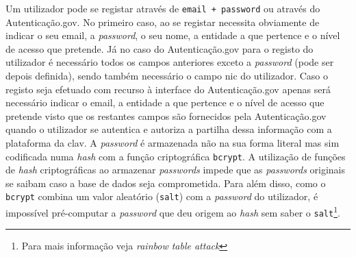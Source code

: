 Um utilizador pode se registar através de \texttt{email + password} ou através do Autenticação.gov. No primeiro caso, ao se registar necessita obviamente de indicar o seu email, a \textit{password}, o seu nome, a entidade a que pertence e o nível de acesso que pretende. Já no caso do Autenticação.gov para o registo do utilizador é necessário todos os campos anteriores exceto a \textit{password} (pode ser depois definida), sendo também necessário o campo \acrfull{nic} do utilizador. Caso o registo seja efetuado com recurso à interface do Autenticação.gov apenas será necessário indicar o email, a entidade a que pertence e o nível de acesso que pretende visto que os restantes campos são fornecidos pela Autenticação.gov quando o utilizador se autentica e autoriza a partilha dessa informação com a plataforma da \acrshort{clav}.
A \textit{password} é armazenada não na sua forma literal mas sim codificada numa \textit{hash} com a função criptográfica \texttt{bcrypt}. A utilização de funções de \textit{hash} criptográficas ao armazenar \textit{passwords} impede que as \textit{passwords} originais se saibam caso a base de dados seja comprometida. Para além disso, como o \texttt{bcrypt} combina um valor aleatório (\texttt{salt}) com a \textit{password} do utilizador, é impossível pré-computar a \textit{password} que deu origem ao \textit{hash} sem saber o \texttt{salt}\footnote{Para mais informação veja \textit{rainbow table attack}}.

